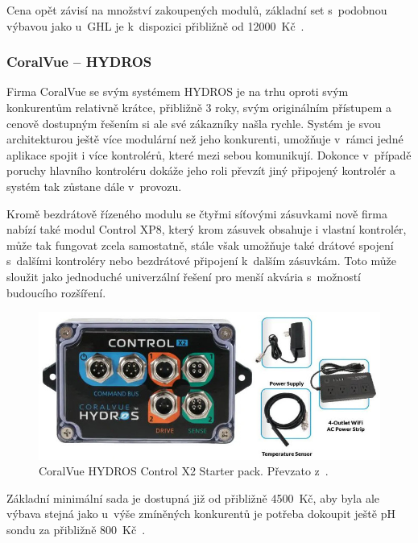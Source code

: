            Cena opět závisí na množství zakoupených modulů, základní set s~podobnou výbavou jako u~GHL je k~dispozici přibližně od \qty{12000}{Kč}~\cite{neptune-systems-why-apex,eshop-neptune-systems-apex}.

        \subsubsection{CoralVue -- HYDROS}
            Firma CoralVue se svým systémem HYDROS je na trhu oproti svým konkurentům relativně krátce, přibližně 3 roky, svým originálním přístupem a cenově dostupným řešením si ale své zákazníky našla rychle. Systém je svou architekturou ještě více modulární než jeho konkurenti, umožňuje v~rámci jedné aplikace spojit i více kontrolérů, které mezi sebou komunikují. Dokonce v~případě poruchy hlavního kontroléru dokáže jeho roli převzít jiný připojený kontrolér a systém tak zůstane dále v~provozu. 
            
            Kromě bezdrátově řízeného modulu se čtyřmi síťovými zásuvkami nově firma nabízí také modul Control XP8, který krom zásuvek obsahuje i vlastní kontrolér, může tak fungovat zcela samostatně, stále však umožňuje také drátové spojení s~dalšími kontroléry nebo bezdrátové připojení k~dalším zásuvkám. Toto může sloužit jako jednoduché univerzální řešení pro menší akvária s~možností budoucího rozšíření. 

            \begin{figure}[h!]
                \centering
                \includegraphics[width=\textwidth]{obrazky/trh/hydros-x2-starter-pack.jpg}
                \caption{CoralVue HYDROS Control X2 Starter pack. Převzato z~\cite{eshop-coralvue-hydros}.}
                \label{fig:obrazky-trh-hydros-x2-starter-pack-jpg}
            \end{figure}
            
            Základní minimální sada je dostupná již od přibližně \qty{4500}{Kč}, aby byla ale výbava stejná jako u~výše zmíněných konkurentů je potřeba dokoupit ještě pH sondu za přibližně \qty{800}{Kč}~\cite{coralvuehydros,eshop-coralvue-hydros}.
            

